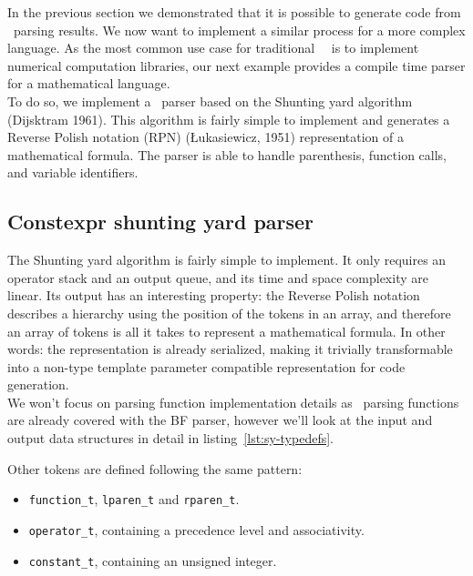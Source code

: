 \documentclass[../../main.tex]{subfiles}
\begin{document}
In the previous section we demonstrated that it is possible to generate code
from \constexpr~parsing results. We now want to implement a similar process for
a more complex language. As the most common use case for traditional
\cpp~\dsel~is to implement numerical computation libraries, our next example
provides a compile time parser for a mathematical language.\\

To do so, we implement a \constexpr~parser based on the Shunting
yard algorithm (Dijsktram 1961). This algorithm is fairly simple to implement
and generates a Reverse Polish notation (RPN) (Łukasiewicz, 1951) representation
of a mathematical formula. The parser is able to handle parenthesis, function calls,
and variable identifiers.

\subsection{Constexpr shunting yard parser}

The Shunting yard algorithm is fairly simple to implement. It only requires an
operator stack and an output queue, and its time and space complexity are
linear. Its output has an interesting property: the Reverse Polish notation
describes a hierarchy using the position of the tokens in an array, and
therefore an array of tokens is all it takes to represent a mathematical formula.
In other words: the representation is already serialized, making it trivially
transformable into a non-type template parameter compatible representation for
code generation.\\

We won't focus on parsing function implementation details as
\constexpr~parsing functions are already covered with the BF parser, however
we'll look at the input and output data structures in detail in
listing~\ref{lst:sy-typedefs}.



Other tokens are defined following the same pattern:

\begin{itemize}
\item \lstinline|function_t|, \lstinline|lparen_t| and \lstinline|rparen_t|.
\item \lstinline|operator_t|, containing a precedence level and associativity.
\item \lstinline|constant_t|, containing an unsigned integer.
\end{itemize}
\end{document}
